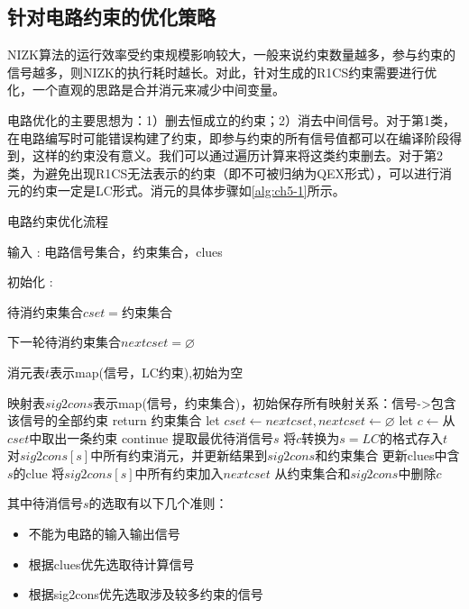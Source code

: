 \subsection{针对电路约束的优化策略} NIZK算法的运行效率受约束规模影响较大，一般来说约束数量越多，参与约束的信号越多，则NIZK的执行耗时越长。对此，针对生成的R1CS约束需要进行优化，一个直观的思路是合并消元来减少中间变量。

电路优化的主要思想为：1）删去恒成立的约束；2）消去中间信号。对于第1类，在电路编写时可能错误构建了约束，即参与约束的所有信号值都可以在编译阶段得到，这样的约束没有意义。我们可以通过遍历计算来将这类约束删去。对于第2类，为避免出现R1CS无法表示的约束（即不可被归纳为QEX形式），可以进行消元的约束一定是LC形式。消元的具体步骤如\autoref{alg:ch5-1}所示。
\begin{breakablealgorithm}
    \caption{电路约束优化流程}
    \label{alg:ch5-1}
    \begin{algorithmic} 
        \item [输入]: 电路信号集合，约束集合，clues
        \item [初始化]: 
        
        待消约束集合$cset=$约束集合
        
        下一轮待消约束集合$nextcset=\varnothing$

        消元表$t$表示map(信号，LC约束),初始为空

        映射表$sig2cons$表示map(信号，约束集合)，初始保存所有映射关系：信号->包含该信号的全部约束
        \REPEAT
        \STATE return 约束集合
        \ENDIF
        \STATE let $cset \leftarrow nextcset, nextcset \leftarrow \varnothing$
        \ENDIF
        \STATE let $c \leftarrow $从$cset$中取出一条约束
        \STATE continue
        \ENDIF
        \STATE 提取最优待消信号$s$
        \STATE 将$c$转换为$s=LC$的格式存入$t$
        \STATE 对$sig2cons[s]$中所有约束消元，并更新结果到$sig2cons$和约束集合
        \STATE 更新clues中含$s$的clue
        \STATE 将$sig2cons[s]$中所有约束加入$nextcset$
        \STATE 从约束集合和$sig2cons$中删除$c$
        \ENDIF

    \end{algorithmic}
\end{breakablealgorithm}
其中待消信号$s$的选取有以下几个准则：
\begin{itemize}
    \setlength{\itemsep}{0pt}
    \setlength{\parsep}{0pt}
    \setlength{\parskip}{0pt}
    \item 不能为电路的输入输出信号
    \item 根据clues优先选取待计算信号
    \item 根据sig2cons优先选取涉及较多约束的信号
\end{itemize}